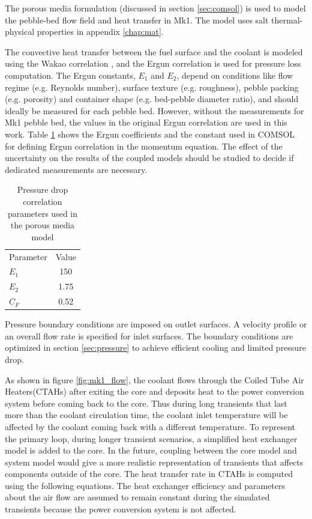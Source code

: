 \documentclass{elsarticle}
\begin{document}
The porous media formulation (discussed in section \ref{sec:comsol}) is used to model the pebble-bed flow field and heat transfer in Mk1. The model uses salt thermal-physical properties in appendix \ref{chap:mat}. 

The convective heat transfer between the fuel surface and the coolant is modeled using the Wakao correlation \cite{Wakao1979}, and the Ergun correlation \cite{Ergun1949} is used for pressure loss computation.
The Ergun constants, $E_1$ and $E_2$, depend on conditions like flow regime (e.g. Reynolds number), surface texture (e.g. roughness), pebble packing (e.g. porosity) and container shape (e.g. bed-pebble diameter ratio), and  should ideally be measured for each pebble bed. However, without the measurements for Mk1 pebble bed, the values in the original Ergun correlation are used in this work. Table \ref{tab:ergun_coef} shows the Ergun coefficients and the constant used in COMSOL for defining Ergun correlation in the momentum equation. The effect of the uncertainty on the results of the coupled models should be studied to decide if dedicated measurements are necessary.

\begin{table}
\centering
  \begin{tabular}{lc}
    Parameter & Value\\
    $E_1$ &150 \\
    $E_2$ &1.75\\
     $C_F$ & 0.52 \\
  \end{tabular}
  \caption{Pressure drop correlation parameters used in the porous media model}
  \label{tab:ergun_coef}
\end{table}



Pressure boundary conditions are imposed on outlet surfaces. A velocity profile or an overall flow rate is specified for inlet surfaces. The boundary conditions are optimized in section \ref{sec:pressure} to achieve efficient cooling and limited pressure drop.
    

As shown in figure \ref{fig:mk1_flow}, the coolant flows through the Coiled Tube Air Heaters(CTAHs) after exiting the core and deposits heat to the power conversion system before coming back to the core. Thus during long transients that last more than the coolant circulation time, the coolant inlet temperature will be affected by the coolant coming back with a different temperature. To represent the primary loop, during longer transient scenarios, a simplified heat exchanger model is added to the core. In the future, coupling between the core model and system model would give a more realistic representation of transients that affects components outside of the core.
The heat transfer rate in CTAHs is computed using the following equations. The heat exchanger efficiency and parameters about the air flow are assumed to remain constant during the simulated transients because the power conversion system is not affected.
\end{document}
